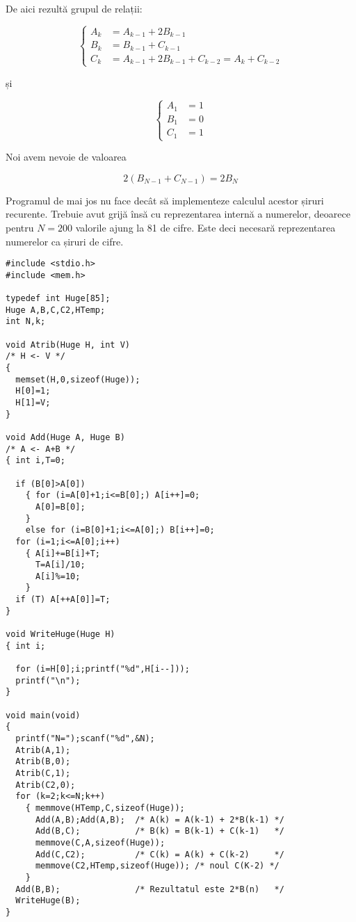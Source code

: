De aici rezultă grupul de relații:

\begin{equation}
  \begin{cases}
    A_k & = A_{k - 1} + 2B_{k - 1} \\
    B_k & = B_{k - 1} + C_{k - 1} \\
    C_k & = A_{k - 1} + 2B_{k - 1} + C_{k - 2} = A_k + C_{k - 2}
  \end{cases}
\end{equation}

și

\begin{equation}
  \begin{cases}
    A_1 & = 1 \\
    B_1 & = 0 \\
    C_1 & = 1
  \end{cases}
\end{equation}

Noi avem nevoie de valoarea 

\begin{equation}
  2(B_{N-1} + C_{N-1}) = 2B_N
\end{equation}

Programul de mai jos nu face decât să implementeze calculul acestor șiruri
recurente. Trebuie avut grijă însă cu reprezentarea internă a numerelor,
deoarece pentru $N=200$ valorile ajung la 81 de cifre. Este deci necesară
reprezentarea numerelor ca șiruri de cifre.

\begin{verbatim}
#include <stdio.h>
#include <mem.h>

typedef int Huge[85];
Huge A,B,C,C2,HTemp;
int N,k;

void Atrib(Huge H, int V)
/* H <- V */
{
  memset(H,0,sizeof(Huge));
  H[0]=1;
  H[1]=V;
}

void Add(Huge A, Huge B)
/* A <- A+B */
{ int i,T=0;

  if (B[0]>A[0])
    { for (i=A[0]+1;i<=B[0];) A[i++]=0;
      A[0]=B[0];
    }
    else for (i=B[0]+1;i<=A[0];) B[i++]=0;
  for (i=1;i<=A[0];i++)
    { A[i]+=B[i]+T;
      T=A[i]/10;
      A[i]%=10;
    }
  if (T) A[++A[0]]=T;
}

void WriteHuge(Huge H)
{ int i;

  for (i=H[0];i;printf("%d",H[i--]));
  printf("\n");
}

void main(void)
{
  printf("N=");scanf("%d",&N);
  Atrib(A,1);
  Atrib(B,0);
  Atrib(C,1);
  Atrib(C2,0);
  for (k=2;k<=N;k++)
    { memmove(HTemp,C,sizeof(Huge));
      Add(A,B);Add(A,B);  /* A(k) = A(k-1) + 2*B(k-1) */
      Add(B,C);           /* B(k) = B(k-1) + C(k-1)   */
      memmove(C,A,sizeof(Huge));
      Add(C,C2);          /* C(k) = A(k) + C(k-2)     */
      memmove(C2,HTemp,sizeof(Huge)); /* noul C(K-2) */
    }
  Add(B,B);               /* Rezultatul este 2*B(n)   */
  WriteHuge(B);
}
\end{verbatim}
